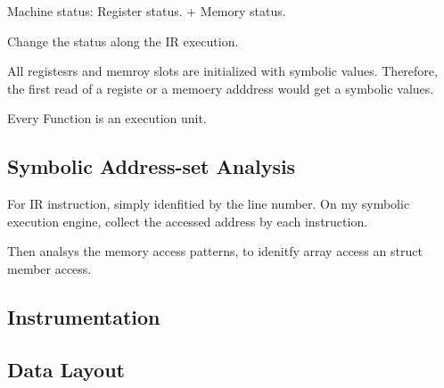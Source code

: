 Machine status: Register status. + Memory status.

Change the status along the IR execution.

All registesrs and memroy slots are initialized with symbolic values.
Therefore, the first read of a registe or a memoery adddress would get a symbolic values.

Every Function is an execution unit.




\subsection{Symbolic Address-set Analysis}
For IR instruction, simply idenfitied by the line number.
On my symbolic execution engine, collect the accessed address by each instruction.

Then analsys the memory access patterns, to
idenitfy array access an struct member access.




\subsection{Instrumentation}

\subsection{Data Layout}



